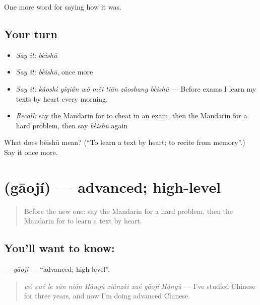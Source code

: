 \begin{grammarlens}[title={What you've built}]
One more word for saying how it was.
\end{grammarlens}

\subsection*{Your turn}
\begin{itemize}
\raggedright
  \item \emph{Say it:} \emph{bèishū}
  \item \emph{Say it:} \emph{bèishū}, once more
  \item \emph{Say it:} \emph{kǎoshì yǐqián wǒ měi tiān zǎoshang bèishū} — Before exams I learn my texts by heart every morning.
  \item \emph{Recall:} say the Mandarin for to cheat in an exam, then the Mandarin for a hard problem, then say \emph{bèishū} again
\end{itemize}

\begin{tcolorbox}[breakable,colback=teal!4,colframe=teal!35!black,title={Before you move on}]
What does bèishū mean? (\textquotedblleft{}To learn a text by heart; to recite from memory\textquotedblright{}.) Say it once more.
\end{tcolorbox}
\section[\texorpdfstring{\zh{高级} (gāojí)}{高级 (gāojí)}]{ (gāojí) — advanced; high-level}

\label{lesson:ZH-C496-gaoji}



\begin{quote}
Before the new one: say the Mandarin for a hard problem, then the Mandarin for to learn a text by heart.
\end{quote}

\subsection*{You'll want to know: }
\textbf{} — \emph{gāojí} — \textquotedblleft{}advanced; high-level\textquotedblright{}.

\begin{quote}
\textbf{} \emph{wǒ xué le sān nián Hànyǔ xiànzài xué gāojí Hànyǔ} — I've studied Chinese for three years, and now I'm doing advanced Chinese.
\end{quote}

